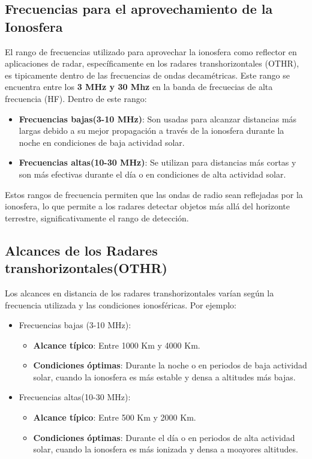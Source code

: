 \documentclass[12pt]{article}
\begin{document}
\subsection{Frecuencias para el aprovechamiento de la Ionosfera}
El rango de frecuencias utilizado para aprovechar la ionosfera como reflector 
en aplicaciones de radar, específicamente en los radares  transhorizontales (OTHR),
es tipicamente dentro de las frecuencias de ondas decamétricas. Este rango se
encuentra entre los \textbf{3 MHz y 30 Mhz} en la banda de frecuecias de alta 
frecuencia (HF). Dentro de este rango:
\begin{itemize}
    \item \textbf{Frecuencias bajas(3-10 MHz)}: Son usadas para alcanzar distancias
    más largas debido a su mejor propagación a través de la ionosfera durante la noche 
    en condiciones de baja actividad solar.
    \item  \textbf{Frecuencias altas(10-30 MHz)}: Se utilizan para distancias más
    cortas y son más efectivas durante el día o en condiciones de alta actividad solar.
\end{itemize}
Estos rangos de frecuencia permiten que las ondas de radio sean reflejadas por la 
ionosfera, lo que permite a los radares detectar objetos más allá del horizonte terrestre,
significativamente el rango de detección.

\subsection{Alcances de los Radares transhorizontales(OTHR)}
Los alcances en distancia de los radares transhorizontales varían según la frecuencia 
utilizada y las condiciones ionosféricas. Por ejemplo:
\begin{itemize}
    \item Frecuencias bajas (3-10 MHz):
    \begin{itemize}
        \item \textbf{Alcance típico}: Entre 1000 Km y 4000 Km.
        \item \textbf{Condiciones óptimas}: Durante la noche o en periodos de baja actividad
        solar, cuando la ionosfera es más estable y densa a altitudes más bajas.
    \end{itemize}
    \item Frecuencias altas(10-30 MHz):
    \begin{itemize}
        \item \textbf{Alcance típico}: Entre 500 Km y 2000 Km.
        \item \textbf{Condiciones óptimas}: Durante el día o en periodos de alta actividad
        solar, cuando la ionosfera es más ionizada y densa a moayores altitudes.
    \end{itemize}
\end{itemize}
\end{document}
